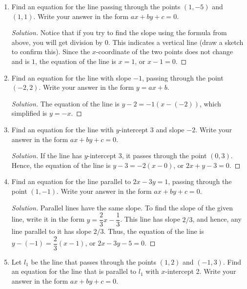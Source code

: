 \documentclass[12pt]{article}
\newenvironment{solution}{\begin{proof}[Solution]}{\end{proof}}
\begin{document}
\begin{enumerate}
		\begin{solution}
			The equation of a nonvertical line passing through two points $(x_1,y_1)$ and $(x_2,y_2)$ is $y-y_1=m(x-x_1)$, where the slope $m=\dfrac{y_2-y_1}{x_2-x_1}$. Note that it does not matter which point is first and which is second - they form the same line. For the given line, the slope is $m=\dfrac{2-0}{1-(-1)}=1$, so the equation of the line is $y-2=1(x-1)$, or $y=x+1$.
		\end{solution}
		\item Find an equation for the line passing through the points $(1,-5)$ and $(1,1)$. Write your answer in the form $ax+by+c=0$.
		\begin{solution}
			Notice that if you try to find the slope using the formula from above, you will get division by $0$. This indicates a vertical line (draw a sketch to confirm this). Since the $x$-coordinate of the two points does not change and is $1$, the equation of the line is $x=1$, or $x-1=0$.
		\end{solution}
		\item Find an equation for the line with slope $-1$, passing through the point $(-2,2)$. Write your answer in the form $y=ax+b$.
		\begin{solution}
			The equation of the line is $y-2=-1(x-(-2))$, which simplified is $y=-x$.
		\end{solution}
		\item Find an equation for the line with $y$-intercept 3 and slope $-2$. Write your answer in the form $ax+by+c=0$.
		\begin{solution}
			If the line has $y$-intercept $3$, it passes through the point $(0,3)$. Hence, the equation of the line is $y-3=-2(x-0)$, or $2x+y-3=0$.
		\end{solution}
		\item Find an equation for the line parallel to $2x-3y=1$, passing through the point $(1,-1)$. Write your answer in the form $ax+by+c=0$.
		\begin{solution}
			Parallel lines have the same slope. To find the slope of the given line, write it in the form $y=\dfrac{2}{3}x-\dfrac{1}{3}$. This line has slope $2/3$, and hence, any line parallel to it has slope $2/3$. Thus, the equation of the line is $y-(-1)=\dfrac{2}{3}(x-1)$, or $2x-3y-5=0$.
		\end{solution}
		\item Let $l_1$ be the line that passes through the points $(1,2)$ and $(-1,3)$. Find an equation for the line that is parallel to $l_1$ with $x$-intercept 2. Write your answer in the form $ax+by+c=0$.

\end{enumerate}
\end{document}
